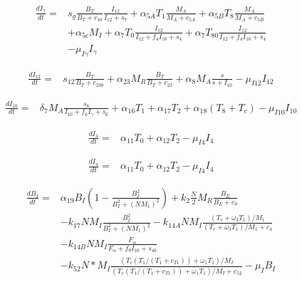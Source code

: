 \documentclass{article}
\begin{document}
	\begin{equation}
		\begin{aligned}
			\frac{dI_\gamma}{dt} ={} & s_g \frac{B_T}{B_T + c_{10}} \frac{I_{12}}{I_{12} + s_7} + \alpha_{5A} T_1 \frac{M_A}{M_A + c_{5A}} + \alpha_{5B} T_8 \frac{M_A}{M_A + c_{5B}}\\
			& + \alpha_{5c} M_I + \alpha_7 T_0 \frac{I_{12}}{I_{12} + f_4 I_{10} + s_4} + \alpha_7 T_{80} \frac{I_{12}}{I_{12} + f_4 I_{10} + s_4}\\
			& - \mu_{I\gamma} I_\gamma
		\end{aligned}
	\end{equation}
	
	\begin{equation}
		\begin{aligned}
			\frac{dI_{12}}{dt} ={} & s_{12} \frac{B_T}{B_T + c_{230}} + \alpha_{23} M_R \frac{B_T}{B_T + c_{23}} + \alpha_8 M_A \frac{s}{s + I_{10}} - \mu_{I12} I_{12}
		\end{aligned}
	\end{equation}
	
	\begin{equation}
		\begin{aligned}
			\frac{dI_{10}}{dt} ={} & \delta_7 M_A \frac{s_6}{I_{10} + f_6 I_\gamma + s_6} + \alpha_{16} T_1 + \alpha_{17} T_2 + \alpha_{18} (T_8 + T_c) - \mu_{I10} I_{10}
		\end{aligned}
	\end{equation}
	
	\begin{equation}
		\begin{aligned}
			\frac{dI_4}{dt} ={} & \alpha_{11} T_0 + \alpha_{12} T_2 - \mu_{I4} I_4
		\end{aligned}
	\end{equation}
	
	\begin{equation}
		\begin{aligned}
			\frac{dI_4}{dt} ={} & \alpha_{11} T_0 + \alpha_{12} T_2 - \mu_{I4} I_4
		\end{aligned}
	\end{equation}
	
	\begin{equation}
		\begin{aligned}
			\frac{dB_I}{dt} ={} & \alpha_{19} B_I \left(1 - \frac{B_I^2} {B_I^2 + (N M_1)^2}\right) +  k_2 \frac{N}{2} M_R \frac{B_E}{B_E + c_9}\\
			& - k_{17} N M_I \frac{B_I^2} {B_I^2 + (N M_1)^2} - k_{14A} N M_I \frac{(T_c + \omega_3 T_1)/M_1}{(T_c + \omega_3 T_1)/M_1 + c_4}\\
			& - k_{14B} N M_I \frac{F_\alpha}{F_\alpha + f_9 I_{10} + s_{4b}}\\
			& - k_{52} N * M_I \frac{(T_c (T_1 / (T_1 + c_{T1})) + \omega_1 T_1)/M_I}{(T_c (T_1 / (T_1 + c_{T1})) + \omega_1 T_1)/M_I + c_{52}} - \mu_I B_I
		\end{aligned}
	\end{equation}
	
\end{document}
